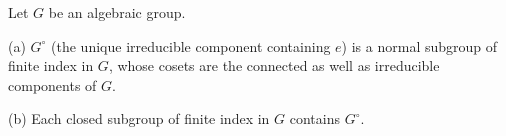 Let $G$ be an algebraic group.

(a) $G^\circ$ (the unique irreducible component containing $e$) is a normal subgroup of finite index in $G$, whose cosets are the connected as well as irreducible components of $G$.

(b) Each closed subgroup of finite index in $G$ contains $G^\circ$.
